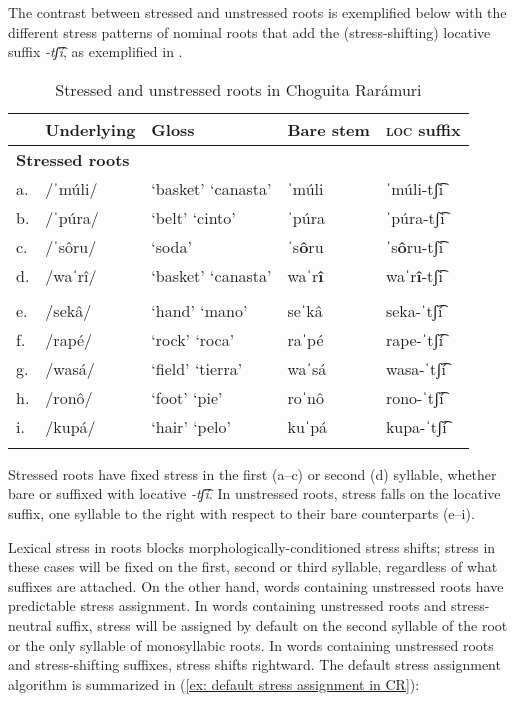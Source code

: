The contrast between stressed and unstressed roots is exemplified below with the different stress patterns of nominal roots that add the (stress-shifting) locative suffix \textit{{}-}\textit{tʃ͡í}, as exemplified in .

\begin{table}
\caption{Stressed and unstressed roots in Choguita Rarámuri}
\label{tab:stressed-unstressed-contrasts}

\begin{tabularx}{\textwidth}{lllXl}
\lsptoprule
&\textbf{Underlying} & \textbf{Gloss} & \textbf{Bare stem}  & \textbf{\textsc{loc} suffix} \\
\midrule
\multicolumn{2}{l}{\textbf{Stressed roots}}  \\
\midrule
a.& /ˈm{ú}li/ &   ‘basket’ `canasta' & ˈmúli &  ˈmúli-tʃ͡i \\
b.& /ˈp{ú}ra/  &  ‘belt’ `cinto'  &    ˈpúra & ˈpúra-tʃ͡i \\
c.& /ˈsôru/  &  ‘soda’ &     ˈs\textbf{ô}ru & ˈs\textbf{ô}ru-tʃ͡i  \\
d.& /waˈrî/  &  ‘basket’ `canasta' &   waˈr\textbf{î} & waˈr\textbf{î}-tʃ͡i \\
\tablevspace
\multicolumn{2}{l}{\textbf{Untressed roots}}  \\
\midrule
e.& /sekâ/ &   ‘hand’ `mano'  & seˈkâ  & seka-ˈtʃ͡í   \\
f.& /rapé/  &  ‘rock’ `roca'  &    raˈpé & rape-ˈtʃ͡í  \\
g.& /wasá/   & ‘field’ `tierra' &   waˈsá & wasa-ˈtʃ͡í\\
h.& /ronô/    & ‘foot’ `pie'  &  roˈnô & rono-ˈtʃ͡í \\
i.& /kupá/    & ‘hair’ `pelo'  &  kuˈpá & kupa-ˈtʃ͡í \\
\lspbottomrule
\end{tabularx}
\end{table}

Stressed roots have fixed stress in the first (a--c) or second (d) syllable, whether bare or suffixed with locative \textit{-tʃ͡í}. In unstressed roots, stress falls on the locative suffix, one syllable to the right with respect to their bare counterparts (e--i).

Lexical stress in roots blocks morphologically-conditioned stress shifts; stress in these cases will be fixed on the first, second or third syllable, regardless of what suffixes are attached. On the other hand, words containing unstressed roots have predictable stress assignment. In words containing unstressed roots and stress-neutral suffix, stress will be assigned by default on the second syllable of the root or the only syllable of monosyllabic roots. In words containing unstressed roots and stress-shifting suffixes, stress shifts rightward. The default stress assignment algorithm is summarized in (\ref{ex: default stress assignment in CR}):

